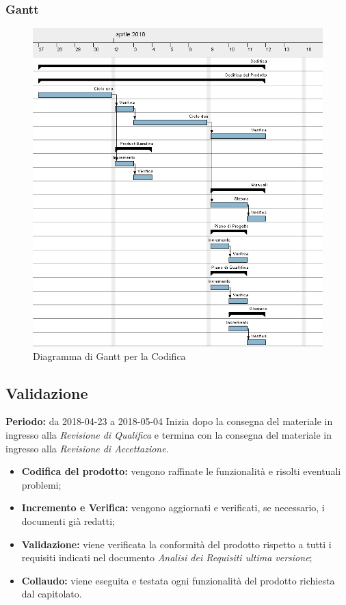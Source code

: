 \subsubsection{Gantt}
\begin{figure}[H]
	\centering 
	\includegraphics[width=1\textwidth]{images/Codifica.png}
	\caption{Diagramma di Gantt per la Codifica}
	\label{graficobello5} 
\end{figure}
\subsection{Validazione}
    \textbf{Periodo:} da 2018-04-23 a 2018-05-04\Spazio
    Inizia dopo la consegna del materiale in ingresso alla \emph{Revisione di Qualifica} e termina con la consegna del materiale in ingresso alla \emph{Revisione di Accettazione}.
    \begin{itemize}
    	\item \textbf{Codifica del prodotto:} vengono raffinate le funzionalità e risolti eventuali problemi;
    	\item \textbf{Incremento e Verifica:} vengono aggiornati e verificati, se necessario, i documenti già redatti; 
    	\item \textbf{Validazione:} viene verificata la conformità del prodotto rispetto a tutti i requisiti indicati nel documento \emph{Analisi dei Requisiti ultima versione};
    	\item \textbf{Collaudo:} viene eseguita e testata ogni funzionalità del prodotto richiesta dal capitolato.
    \end{itemize}
